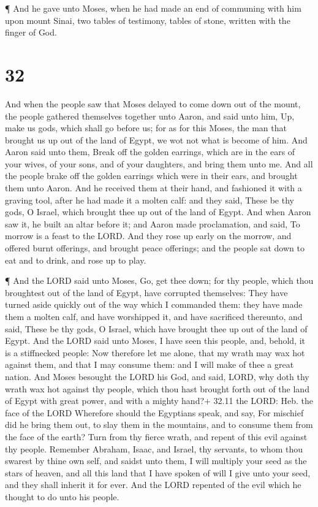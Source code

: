  ¶ And he gave unto Moses, when he had made an end of
communing with him upon mount Sinai, two tables of testimony, tables of
stone, written with the finger of God.

\hypertarget{section-31}{%
\section{32}\label{section-31}}

 And when the people saw that Moses delayed to come down out
of the mount, the people gathered themselves together unto Aaron, and
said unto him, Up, make us gods, which shall go before us; for as for
this Moses, the man that brought us up out of the land of Egypt, we wot
not what is become of him.  And Aaron said unto them, Break
off the golden earrings, which are in the ears of your wives, of your
sons, and of your daughters, and bring them unto me.  And
all the people brake off the golden earrings which were in their ears,
and brought them unto Aaron.  And he received them at their
hand, and fashioned it with a graving tool, after he had made it a
molten calf: and they said, These be thy gods, O Israel, which brought
thee up out of the land of Egypt.  And when Aaron saw it, he
built an altar before it; and Aaron made proclamation, and said, To
morrow is a feast to the LORD.  And they rose up early on
the morrow, and offered burnt offerings, and brought peace offerings;
and the people sat down to eat and to drink, and rose up to play.

 ¶ And the LORD said unto Moses, Go, get thee down; for thy
people, which thou broughtest out of the land of Egypt, have corrupted
themselves:  They have turned aside quickly out of the way
which I commanded them: they have made them a molten calf, and have
worshipped it, and have sacrificed thereunto, and said, These be thy
gods, O Israel, which have brought thee up out of the land of Egypt.
 And the LORD said unto Moses, I have seen this people, and,
behold, it is a stiffnecked people:  Now therefore let me
alone, that my wrath may wax hot against them, and that I may consume
them: and I will make of thee a great nation.  And Moses
besought the LORD his God, and said, LORD, why doth thy wrath wax hot
against thy people, which thou hast brought forth out of the land of
Egypt with great power, and with a mighty hand?+ 32.11 the LORD: Heb.
the face of the LORD  Wherefore should the Egyptians speak,
and say, For mischief did he bring them out, to slay them in the
mountains, and to consume them from the face of the earth? Turn from thy
fierce wrath, and repent of this evil against thy people. 
Remember Abraham, Isaac, and Israel, thy servants, to whom thou swarest
by thine own self, and saidst unto them, I will multiply your seed as
the stars of heaven, and all this land that I have spoken of will I give
unto your seed, and they shall inherit it for ever.  And
the LORD repented of the evil which he thought to do unto his people.

